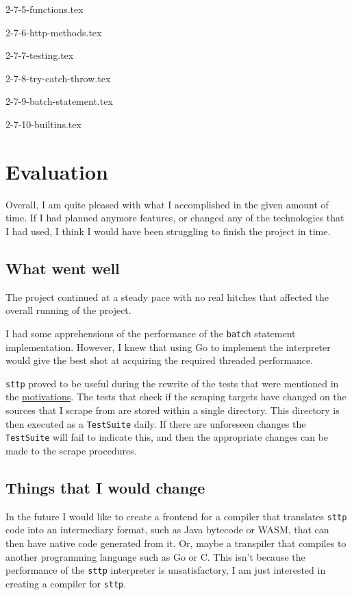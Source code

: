 \documentclass[]{full}
\theoremstyle{definition}
\begin{document}
{2-7-5-functions.tex}

{2-7-6-http-methods.tex}

{2-7-7-testing.tex}

{2-7-8-try-catch-throw.tex}

{2-7-9-batch-statement.tex}

{2-7-10-builtins.tex}

\chapter{Evaluation}
\label{chap:evaluation}

Overall, I am quite pleased with what I accomplished in the given amount of time. If I had planned anymore features, or changed any of the technologies that I had used, I think I would have been struggling to finish the project in time.

\section{What went well}

The project continued at a steady pace with no real hitches that affected the overall running of the project.

I had some apprehensions of the performance of the \verb|batch| statement implementation. However, I knew that using Go to implement the interpreter would give the best shot at acquiring the required threaded performance.

\verb|sttp| proved to be useful during the rewrite of the tests that were mentioned in the \hyperref[chap:motivations]{motivations}. The tests that check if the scraping targets have changed on the sources that I scrape from are stored within a single directory. This directory is then executed as a \verb|TestSuite| daily. If there are unforeseen changes the \verb|TestSuite| will fail to indicate this, and then the appropriate changes can be made to the scrape procedures.

\section{Things that I would change}

In the future I would like to create a frontend for a compiler that translates \verb|sttp| code into an intermediary format, such as Java bytecode or WASM, that can then have native code generated from it. Or, maybe a transpiler that compiles to another programming language such as Go or C. This isn't because the performance of the \verb|sttp| interpreter is unsatisfactory, I am just interested in creating a compiler for \verb|sttp|.
\end{document}
